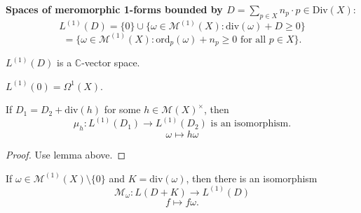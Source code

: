 \documentclass{article}
\begin{document}
\begin{definition}
\textbf{Spaces of meromorphic 1-forms bounded by $D = \sum_{p \in X} n_p \cdot p \in \mathrm{Div}(X)$}:
$$L^{(1)}(D) = \{0\} \cup \{ \omega \in \mathcal{M}^{(1)}(X): \mathrm{div}(\omega) + D \ge 0 \}$$
$$ = \{ \omega \in \mathcal{M}^{(1)}(X): \mathrm{ord}_p(\omega) + n_p \ge 0 \text{ for all } p \in X \}.$$
\end{definition}

\begin{remark}
$L^{(1)}(D)$ is a $\mathbb{C}$-vector space.
\end{remark}
\begin{example}
$L^{(1)}(0) = \Omega^1(X)$.
\end{example}

\begin{lemma}
If $D_1 = D_2 + \mathrm{div}(h)$ for some $h \in \mathcal{M}(X)^\times$, then
$$\mu_h: L^{(1)}(D_1) \to L^{(1)}(D_2) \text{ is an isomorphism.}$$
$$\omega \mapsto h\omega$$
\end{lemma}
\begin{proof}
Use lemma above.
\end{proof}

\begin{proposition}
If $\omega \in \mathcal{M}^{(1)}(X) \setminus \{0\}$ and $K = \mathrm{div}(\omega)$, then there is an
isomorphism
$$\mathcal{M}_\omega: L(D+K) \to L^{(1)}(D)$$
$$f \mapsto f\omega.$$
\end{proposition}
\end{document}
